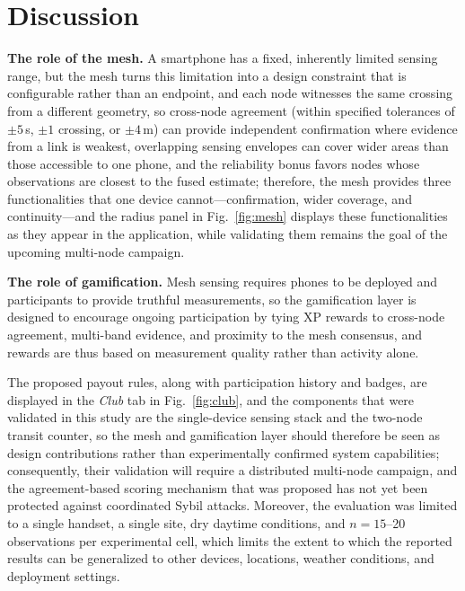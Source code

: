 \documentclass[conference,10pt]{IEEEtran}
\begin{document}
\section{Discussion}
\textbf{The role of the mesh.} A smartphone has a fixed, inherently
limited sensing range, but the mesh turns this limitation into a design
constraint that is configurable rather than an endpoint, and each node
witnesses the same crossing from a different geometry, so cross-node
agreement (within specified tolerances of $\pm5$\,s, $\pm1$ crossing, or
$\pm4$\,m) can provide independent confirmation where evidence from a link
is weakest, overlapping sensing envelopes can cover wider areas than those
accessible to one phone, and the reliability bonus favors nodes whose
observations are closest to the fused estimate; therefore, the mesh provides
three functionalities that one device cannot---confirmation, wider coverage,
and continuity---and the radius panel in Fig.~\ref{fig:mesh} displays these
functionalities as they appear in the application, while validating them
remains the goal of the upcoming multi-node campaign.

\textbf{The role of gamification.} Mesh sensing requires phones to be
deployed and participants to provide truthful measurements, so the
gamification layer is designed to encourage ongoing participation by tying
XP rewards to cross-node agreement, multi-band evidence, and proximity to
the mesh consensus, and rewards are thus based on measurement quality rather
than activity alone.

The proposed payout rules, along with participation history and badges, are
displayed in the \emph{Club} tab in Fig.~\ref{fig:club}, and the components
that were validated in this study are the single-device sensing stack and
the two-node transit counter, so the mesh and gamification layer should
therefore be seen as design contributions rather than experimentally
confirmed system capabilities; consequently, their validation will require a
distributed multi-node campaign, and the agreement-based scoring mechanism
that was proposed has not yet been protected against coordinated Sybil
attacks. Moreover, the evaluation was limited to a single handset, a single
site, dry daytime conditions, and $n=15$--20 observations per experimental
cell, which limits the extent to which the reported results can be
generalized to other devices, locations, weather conditions, and deployment
settings.

\end{document}
